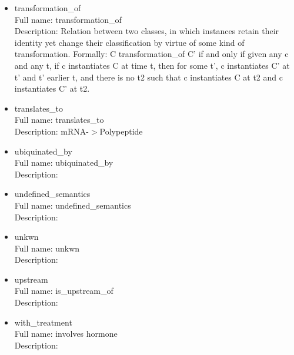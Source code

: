 \begin{itemize}
\item{transformation\_of}\\ Full name: transformation\_of\\ Description: Relation between two classes, in which instances retain their identity yet change their classification by virtue of some kind of transformation. Formally: C transformation\_of C' if and only if given any c and any t, if c instantiates C at time t, then for some t', c instantiates C' at t' and t' earlier t, and there is no t2 such that c instantiates C at t2 and c instantiates C' at t2. 

\item{translates\_to}\\ Full name: translates\_to\\ Description: mRNA-$>$Polypeptide 

\item{ubiquinated\_by}\\ Full name: ubiquinated\_by\\ Description: 

\item{undefined\_semantics}\\ Full name: undefined\_semantics\\ Description: 

\item{unkwn}\\ Full name: unkwn\\ Description: 

\item{upstream}\\ Full name: is\_upstream\_of\\ Description: 

\item{with\_treatment}\\ Full name: involves hormone\\ Description: 

\end{itemize}
